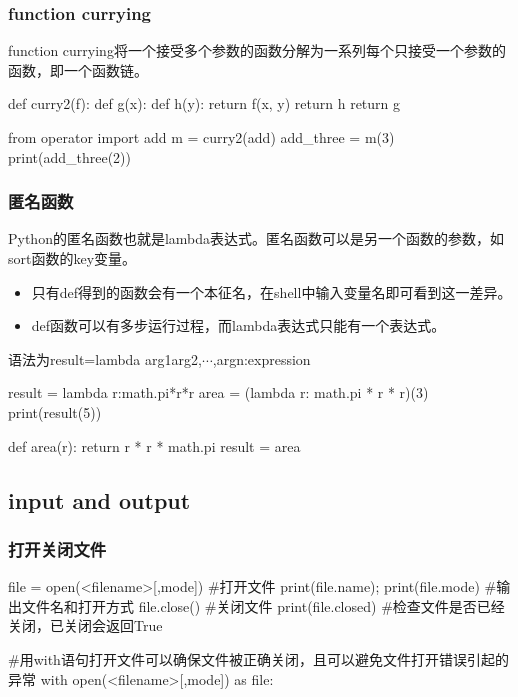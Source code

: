 \documentclass{article}
\begin{document}
      \subsubsection{function currying}
        function currying将一个接受多个参数的函数分解为一系列每个只接受一个参数的函数，即一个函数链。
        \begin{codeblock}[language=python, caption={function currying}]
          def curry2(f):
            def g(x):
              def h(y):
                return f(x, y)
              return h
            return g
            
          from operator import add
          m = curry2(add)
          add_three = m(3)
          print(add_three(2))
        \end{codeblock}
    
      \subsubsection{匿名函数}
        Python的匿名函数也就是lambda表达式。匿名函数可以是另一个函数的参数，如sort函数的key变量。

        \begin{itemize}
          \item 只有def得到的函数会有一个本征名，在shell中输入变量名即可看到这一差异。
          \item def函数可以有多步运行过程，而lambda表达式只能有一个表达式。
        \end{itemize}

        语法为result=lambda \lbrack arg1\lbrack arg2,$\cdots$,argn\rbrack \rbrack:expression
        \begin{codeblock}[language=python, caption={lambda function}]
          result = lambda r:math.pi*r*r
          area = (lambda r: math.pi * r * r)(3)
          print(result(5))

          def area(r):
            return r * r * math.pi
          result = area
        \end{codeblock}

    \subsection{input and output}
      \subsubsection{打开关闭文件}
        \begin{codeblock}[language=python, caption={open and close files}]
          file = open(<filename>[,mode]) #打开文件
          print(file.name); print(file.mode) #输出文件名和打开方式
          file.close() #关闭文件
          print(file.closed) #检查文件是否已经关闭，已关闭会返回True

          #用with语句打开文件可以确保文件被正确关闭，且可以避免文件打开错误引起的异常
          with open(<filename>[,mode]) as file:
        \end{codeblock}
\end{document}
